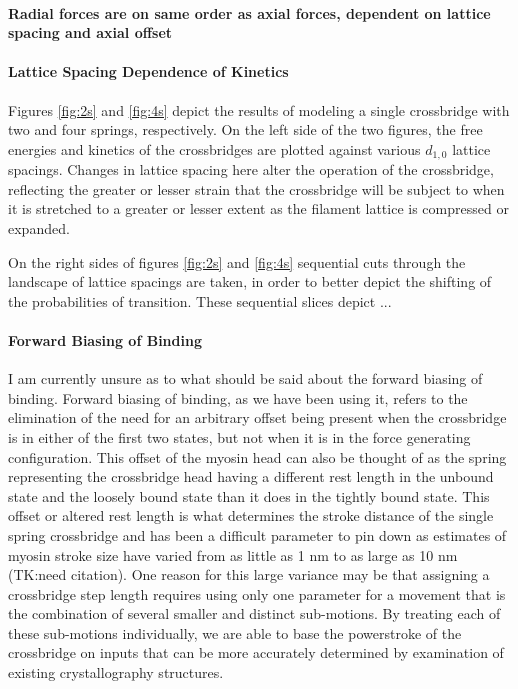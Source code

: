 \documentclass[]{article}
\begin{document}
\paragraph{Radial forces are on same order as axial forces, dependent on lattice spacing and axial offset} %

\paragraph{Lattice Spacing Dependence of Kinetics} %
Figures \ref{fig:2s} and \ref{fig:4s} depict the results of modeling a single crossbridge with two and four springs, respectively.
On the left side of the two figures, the free energies and kinetics of the crossbridges are plotted against various $d_{1,0}$ lattice spacings. 
Changes in lattice spacing here alter the operation of the crossbridge, reflecting the greater or lesser strain that the crossbridge will be subject to when it is stretched to a greater or lesser extent as the filament lattice is compressed or expanded.

On the right sides of figures \ref{fig:2s} and \ref{fig:4s} sequential cuts through the landscape of lattice spacings are taken, in order to better depict the shifting of the probabilities of transition.
These sequential slices depict ...


\paragraph{Forward Biasing of Binding} %
I am currently unsure as to what should be said about the forward biasing of binding.
Forward biasing of binding, as we have been using it, refers to the elimination of the need for an arbitrary offset being present when the crossbridge is in either of the first two states, but not when it is in the force generating configuration.
This offset of the myosin head can also be thought of as the spring representing the crossbridge head having a different rest length in the unbound state and the loosely bound state than it does in the tightly bound state. 
This offset or altered rest length is what determines the stroke distance of the single spring crossbridge and has been a difficult parameter to pin down as estimates of myosin stroke size have varied from as little as 1 nm to as large as 10 nm (TK:need citation). 
One reason for this large variance may be that assigning a crossbridge step length requires using only one parameter for a movement that is the combination of several smaller and distinct sub-motions.
By treating each of these sub-motions individually, we are able to base the powerstroke of the crossbridge on inputs that can be more accurately determined by examination of existing crystallography structures.
\end{document}
